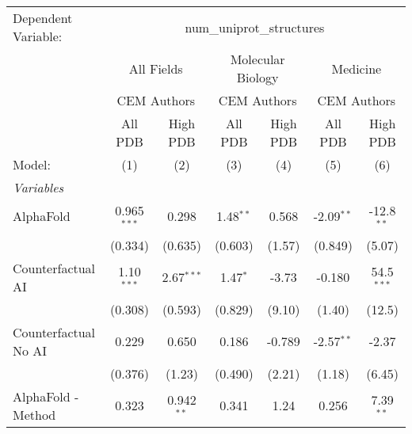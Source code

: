 \begingroup
\centering
\begin{tabular}{lcccccc}
   \tabularnewline \midrule \midrule
   Dependent Variable: & \multicolumn{6}{c}{num\_uniprot\_structures}\\
 & \multicolumn{2}{c}{All Fields} & \multicolumn{2}{c}{Molecular Biology} & \multicolumn{2}{c}{Medicine} \\
\cmidrule(lr){2-3} \cmidrule(lr){4-5} \cmidrule(lr){6-7}
 & \multicolumn{2}{c}{CEM Authors} & \multicolumn{2}{c}{CEM Authors} & \multicolumn{2}{c}{CEM Authors} \\
\cmidrule(lr){2-3} \cmidrule(lr){4-5} \cmidrule(lr){6-7}
 & \multicolumn{1}{c}{All PDB} & \multicolumn{1}{c}{High PDB} & \multicolumn{1}{c}{All PDB} & \multicolumn{1}{c}{High PDB} & \multicolumn{1}{c}{All PDB} & \multicolumn{1}{c}{High PDB} \\
\cmidrule(lr){2-2} \cmidrule(lr){3-3} \cmidrule(lr){4-4} \cmidrule(lr){5-5} \cmidrule(lr){6-6} \cmidrule(lr){7-7}
   Model:                                                     & (1)           & (2)           & (3)          & (4)         & (5)          & (6)\\  
   \midrule
   \emph{Variables}\\
   AlphaFold                                                  & 0.965$^{***}$ & 0.298         & 1.48$^{**}$  & 0.568       & -2.09$^{**}$ & -12.8$^{**}$\\   
                                                              & (0.334)       & (0.635)       & (0.603)      & (1.57)      & (0.849)      & (5.07)\\   
   Counterfactual AI                                          & 1.10$^{***}$  & 2.67$^{***}$  & 1.47$^{*}$   & -3.73       & -0.180       & 54.5$^{***}$\\   
                                                              & (0.308)       & (0.593)       & (0.829)      & (9.10)      & (1.40)       & (12.5)\\   
   Counterfactual No AI                                       & 0.229         & 0.650         & 0.186        & -0.789      & -2.57$^{**}$ & -2.37\\   
                                                              & (0.376)       & (1.23)        & (0.490)      & (2.21)      & (1.18)       & (6.45)\\   
   AlphaFold - Method                                         & 0.323         & 0.942$^{**}$  & 0.341        & 1.24        & 0.256        & 7.39$^{**}$\\   

\end{tabular}
